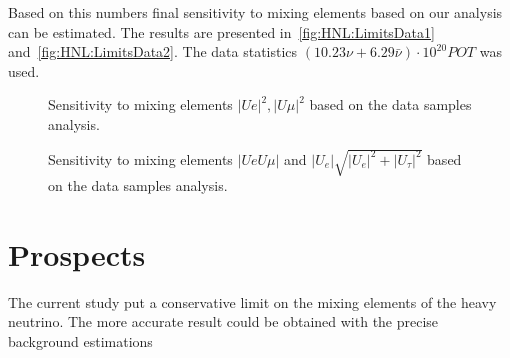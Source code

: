 \documentclass[../main.tex]{subfiles}
\begin{document}
Based on this numbers final sensitivity to mixing elements based on our analysis can be estimated. The results are presented in~\autoref{fig:HNL:LimitsData1} and~\autoref{fig:HNL:LimitsData2}. The data statistics $\left(10.23\nu+6.29\bar{\nu}\right)\cdot 10^{20}POT$ was used.

\begin{figure}[!ht]
    \begin{center}
  \begin{minipage}{0.49\linewidth}
  \end{minipage}
  \hfill
  \begin{minipage}{0.49\linewidth}
  \end{minipage}
  \caption{Sensitivity to mixing elements $\left|Ue\right|^2, \left|U\mu\right|^2$ based on the data samples analysis.}
  \label{fig:HNL:LimitsData1}
    \end{center}
\end{figure}

\begin{figure}[!ht]
    \begin{center}
  \begin{minipage}{0.49\linewidth}
  \end{minipage}
  \begin{minipage}{0.49\linewidth}
  \end{minipage}
  \caption{Sensitivity to mixing elements $\left|UeU\mu\right|$ and $\left|U_{e}\right|\sqrt{\left|U_{e}\right|^2+\left|U_{\tau}\right|^2}$ based on the data samples analysis.}
  \label{fig:HNL:LimitsData2}
  \end{center}
\end{figure}

\clearpage
\section{Prospects}
\label{sec:HNL:prosp}
The current study put a conservative limit on the mixing elements of the heavy neutrino. The more accurate result could be obtained with the precise background estimations
\end{document}
